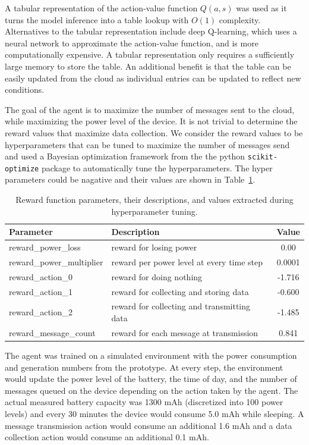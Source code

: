\documentclass[10pt]{cai}
\begin{document}
A tabular representation of the action-value function $Q(a,s)$ was used as it turns the model inference into a table lookup with $O(1)$ complexity.
Alternatives to the tabular representation include deep Q-learning, which uses a neural network to approximate the action-value function, and is more computationally expensive.
A tabular representation only requires a sufficiently large memory to store the table.
An additional benefit is that the table can be easily updated from the cloud as individual entries can be updated to reflect new conditions.

The goal of the agent is to maximize the number of messages sent to the cloud, while maximizing the power level of the device.
It is not trivial to determine the reward values that maximize data collection.
We consider the reward values to be hyperparameters that can be tuned to maximize the number of messages send and used a Bayesian optimization framework from the the python \verb|scikit-optimize| package to automatically tune the hyperparameters.
The hyper parameters could be nagative and their values are shown in Table~\ref{tab:reward_parameters}.

\begin{table}[h]
  \centering
  \caption{Reward function parameters, their descriptions, and values extracted during hyperparameter tuning.}
  \begin{tabular}{l p{8cm} c}
      \toprule
      \textbf{Parameter} & \textbf{Description} & \textbf{Value} \\
      \midrule
      reward\_power\_loss & reward for losing power & 0.00  \\ 
      reward\_power\_multiplier & reward per power level at every time step & 0.0001  \\ 
      reward\_action\_0 & reward for doing nothing & -1.716 \\ 
      reward\_action\_1 & reward for collecting and storing data & -0.600 \\ 
      reward\_action\_2 & reward for collecting and transmitting data & -1.485 \\ 
      reward\_message\_count & reward for each message at transmission & 0.841 \\ 
      \bottomrule
  \end{tabular}
  \label{tab:reward_parameters}
\end{table}

The agent was trained on a simulated environment with the power consumption and generation numbers from the prototype.
At every step, the environment would update the power level of the battery, the time of day, and the number of messages queued on the device depending on the action taken by the agent.
The actual measured battery capacity was 1300 mAh (discretized into 100 power levels) and every 30 minutes the device would consume 5.0 mAh while sleeping.
A message transmission action would consume an additional 1.6 mAh and a data collection action would consume an additional 0.1 mAh.
\end{document}

